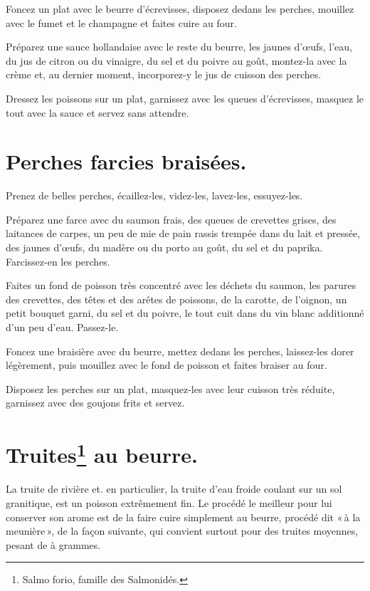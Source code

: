Foncez un plat avec le beurre d’écrevisses, disposez dedans les perches, mouillez
avec le fumet et le champagne et faites cuire au four.

Préparez une sauce hollandaise avec le reste du beurre, les jaunes d'œufs,
l'eau, du jus de citron ou du vinaigre, du sel et du poivre au goût, montez-la
avec la crème et, au dernier moment, incorporez-y le jus de cuisson des
perches.

Dressez les poissons sur un plat, garnissez avec les queues d’écrevisses, masquez
le tout avec la sauce et servez sans attendre.

\section*{\centering Perches farcies braisées.}

Prenez de belles perches, écaillez-les, videz-les, lavez-les, essuyez-les.

Préparez une farce avec du saumon frais, des queues de crevettes grises, des
laitances de carpes, un peu de mie de pain rassis trempée dans du lait et
pressée, des jaunes d'œufs, du madère ou du porto au goût, du sel et du
paprika. Farcissez-en les perches.

Faites un fond de poisson très concentré avec les déchets du saumon, les
parures des crevettes, des têtes et des arêtes de poissons, de la carotte, de
l'oignon, un petit bouquet garni, du sel et du poivre, le tout cuit dans du vin
blanc additionné d'un peu d'eau. Passez-le.

Foncez une braisière avec du beurre, mettez dedans les perches, laissez-les
dorer légèrement, puis mouillez avec le fond de poisson et faites braiser au
four.

Disposez les perches sur un plat, masquez-les avec leur cuisson très réduite,
garnissez avec des goujons frits et servez.

\section*{\centering Truites\footnote{Salmo forio, famille des Salmonidés.} au beurre.}
\label{pg0332} \hypertarget{p0332}{}

La truite de rivière et. en particulier, la truite d'eau froide coulant sur un
sol granitique, est un poisson extrêmement fin. Le procédé le meilleur pour lui
conserver son arome est de la faire cuire simplement au beurre, procédé dit « à
la meunière », de la façon suivante, qui convient surtout pour des truites
moyennes, pesant de {\mmm} à {\mmm} grammes.

